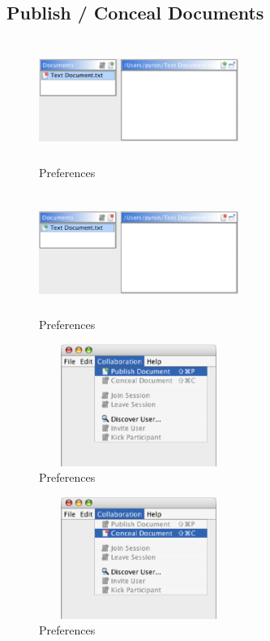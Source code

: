 \documentclass[11pt,a4paper]{article}
\begin{document}
\subsection{Publish / Conceal Documents}
\begin{figure}[H]
\begin{center}
  \includegraphics[height=1.56in, width=2.56in]{../images/usermanual/editor_view_publish.bmp.eps}
\caption{Preferences}
\label{default}
\end{center}
\end{figure}
\begin{figure}[H]
\begin{center}
  \includegraphics[height=1.56in, width=2.56in]{../images/usermanual/editor_view_conceal.bmp.eps}
\caption{Preferences}
\label{default}
\end{center}
\end{figure}
\begin{figure}[H]
\begin{center}
  \includegraphics[height=1.56in, width=2.56in]{../images/usermanual/nmenu_collaboration_publish.bmp.eps}
\caption{Preferences}
\label{default}
\end{center}
\end{figure}
\begin{figure}[H]
\begin{center}
  \includegraphics[height=1.56in, width=2.56in]{../images/usermanual/nmenu_collaboration_conceal.bmp.eps}
\caption{Preferences}
\label{default}
\end{center}
\end{figure}
\end{document}
